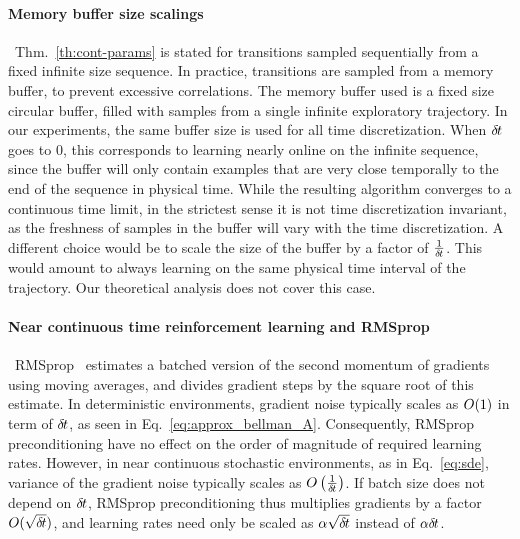 \paragraph{Memory buffer size scalings}~Thm.~\ref{th:cont-params} is stated for
transitions sampled sequentially from a fixed infinite size sequence. In practice,
transitions are sampled from a memory buffer, to prevent excessive correlations.
The memory buffer used is a fixed size circular buffer, filled
with samples from a single infinite exploratory trajectory. In
our experiments, the same buffer size is used for all time discretization. When
${\delta\hspace{-.1em}t}$ goes to $0$, this corresponds to learning nearly online on the
infinite sequence, since the buffer will only contain examples that are very
close temporally to the end of the sequence in physical time.  While the resulting
algorithm converges to a continuous time limit, in the strictest sense it is not
time discretization invariant, as the freshness of samples in the buffer will
vary with the time discretization.
A different choice would be to scale the size of the buffer by a factor of
$\frac{1}{{\delta\hspace{-.1em}t}}$. This would amount to always learning on the same physical time interval of
the trajectory. Our theoretical analysis does not cover this case.

\paragraph{Near continuous time reinforcement learning and RMSprop}~RMSprop~\cite{rmsprop}
estimates a batched version of the second momentum of gradients using moving
averages, and divides gradient steps by the square root of this estimate. In
deterministic environments, gradient noise typically scales as $O(1)$ in
term of ${\delta\hspace{-.1em}t}$, as seen in Eq.~\eqref{eq:approx_bellman_A}.  Consequently, RMSprop
preconditioning have no effect on the order of magnitude of required learning
rates. However, in near continuous stochastic environments, as in
Eq.~\ref{eq:sde}, variance of the gradient noise typically scales as
$O\left(\frac{1}{{\delta\hspace{-.1em}t}}\right)$. If batch size does not depend on
${\delta\hspace{-.1em}t}$, RMSprop preconditioning thus multiplies gradients by a factor $O(\sqrt{{\delta\hspace{-.1em}t}})$,
and learning rates need only be scaled as $\alpha \sqrt{{\delta\hspace{-.1em}t}}$ instead of
$\alpha {\delta\hspace{-.1em}t}$.

